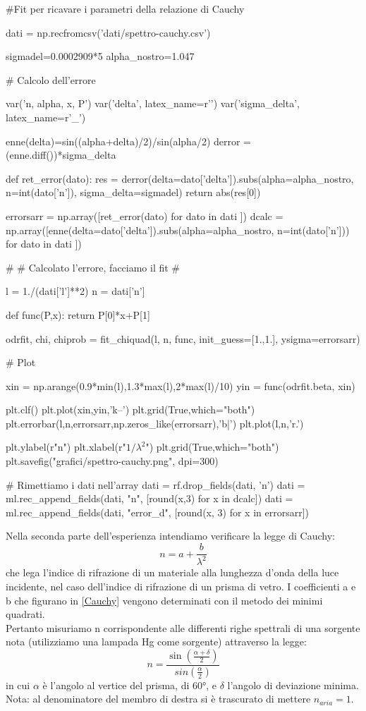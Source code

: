 \begin{sagesilent}
#Fit per ricavare i parametri della relazione di Cauchy

dati = np.recfromcsv('dati/spettro-cauchy.csv')

sigmadel=0.0002909*5
alpha_nostro=1.047

# Calcolo dell'errore

var('n, alpha, x, P')
var('delta', latex_name=r'\delta')
var('sigma_delta', latex_name=r'\sigma_{\delta}')

enne(delta)=sin((alpha+delta)/2)/sin(alpha/2)
derror = (enne.diff())*sigma_delta

def ret_error(dato):
  res = derror(delta=dato['delta']).subs(alpha=alpha_nostro, n=int(dato['n']), sigma_delta=sigmadel)
  return abs(res[0])

errorsarr = np.array([ret_error(dato) for dato in dati ])
dcalc = np.array([enne(delta=dato['delta']).subs(alpha=alpha_nostro, n=int(dato['n'])) for dato in dati ])

#
# Calcolato l'errore, facciamo il fit
#

l = 1./(dati['l']**2)
n = dati['n']

def func(P,x):
    return P[0]*x+P[1]

odrfit, chi, chiprob = fit_chiquad(l, n, func, init_guess=[1.,1.], ysigma=errorsarr)


# Plot

xin = np.arange(0.9*min(l),1.3*max(l),2*max(l)/10)
yin = func(odrfit.beta, xin)

plt.clf()
plt.plot(xin,yin,'k--')
plt.grid(True,which="both")
plt.errorbar(l,n,errorsarr,np.zeros_like(errorsarr),'b|')
plt.plot(l,n,'r.')

plt.ylabel(r"n")
plt.xlabel(r"$1/\lambda^2$")
plt.grid(True,which="both")
plt.savefig("grafici/spettro-cauchy.png", dpi=300)

# Rimettiamo i dati nell'array
dati = rf.drop_fields(dati, 'n')
dati = ml.rec_append_fields(dati, "n", [round(x,3) for x in dcalc])
dati = ml.rec_append_fields(dati, "error_d", [round(x, 3) for x in errorsarr])
\end{sagesilent}

Nella seconda parte dell'esperienza intendiamo verificare la legge di Cauchy:
\begin{equation}
n = a + \frac{b}{\lambda^2}
\label{Cauchy}
\end{equation}
che lega l'indice di rifrazione di un materiale alla lunghezza d'onda della luce incidente, nel caso dell'indice di rifrazione di un prisma di vetro.
I coefficienti a e b che figurano in \ref{Cauchy} vengono determinati con il metodo dei minimi quadrati. \\
Pertanto misuriamo n corrispondente alle differenti righe spettrali di una sorgente nota (utilizziamo una lampada Hg come sorgente) attraverso la legge:
\begin{equation}
n = \frac{\sin(\frac{\alpha + \delta}{2})}{sin(\frac{\alpha}{2})}
\label{n}
\end{equation}
in cui $\alpha$ è l'angolo al vertice del prisma, di $60°$, e $\delta$ l'angolo di deviazione minima. Nota: al denominatore del membro di destra si è trascurato di mettere $n_{aria}=1$.\\

